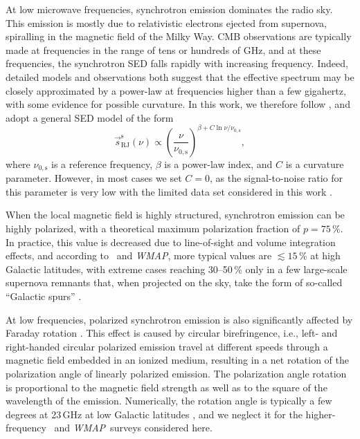\documentclass[twocolumn]{aa}
\def\WMAP{\emph{WMAP}}
\newcommand{\s}[0]{\vec{s}}
\begin{document}
At low microwave frequencies, synchrotron emission dominates the radio
sky. This emission is mostly due to relativistic electrons ejected
from supernova, spiralling in the magnetic field of the Milky Way. CMB
observations are typically made at frequencies in the range of tens or
hundreds of GHz, and at these frequencies, the synchrotron SED falls
rapidly with increasing frequency. Indeed, detailed models and observations both
suggest that the effective spectrum may be closely approximated by a
power-law at frequencies higher than a few gigahertz, with some
evidence for possible curvature. In this work, we therefore follow
\citet{kogut:2012}, and adopt a general SED model of the form
\begin{equation}
  \s_{\mathrm{RJ}}^{\mathrm{s}}(\nu) \propto
  \left(\frac{\nu}{\nu_{0,\mathrm{s}}} \right)^{\beta + C\ln \nu/\nu_{0,\mathrm{s}}},
\end{equation}
where $\nu_{0,\mathrm{s}}$ is a reference frequency, $\beta$ is a
power-law index, and $C$ is a curvature parameter. However, in most
cases we set $C=0$, as the signal-to-noise ratio for this parameter is
very low with the limited data set considered in this work \citep{bp14}.

When the local magnetic field is highly structured, synchrotron
emission can be highly polarized, with a theoretical maximum
polarization fraction of $p=75\,\%$. In practice, this value is
decreased due to line-of-sight and volume integration effects, and
according to \Planck\ and \WMAP, more typical values are
$\lesssim15\,\%$ at high Galactic latitudes, with extreme cases
reaching 30--50\,\% only in a few large-scale supernova remnants that,
when projected on the sky, take the form of so-called ``Galactic
spurs'' \citep{planck2014-a31}.

At low frequencies, polarized synchrotron emission is also
significantly affected by Faraday rotation \citep[e.g.,][and
  references therein]{beck:2013}. This effect is caused by circular
birefringence, i.e., left- and right-handed circular polarized
emission travel at different speeds through a magnetic field embedded
in an ionized medium, resulting in a net rotation of the polarization
angle of linearly polarized emission. The polarization angle rotation
is proportional to the magnetic field strength as well as to the
square of the wavelength of the emission. Numerically, the rotation
angle is typically a few degrees at 23\,GHz at low Galactic latitudes
\citep{Carretti:2019, fuskeland:2019}, and we neglect it for
the higher-frequency \Planck\ and \WMAP\ surveys considered here.
\end{document}
